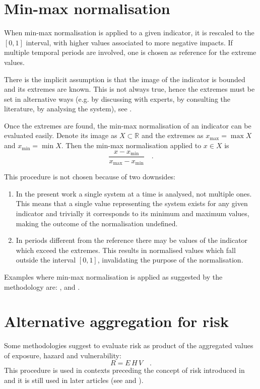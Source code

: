 \section{Min-max normalisation}
\label{sec:Min-max normalisation}
When min-max normalisation is applied to a given \gls{indicator}, it is rescaled to the $[0, 1]$ interval, with higher values associated to more negative \glspl{impact}. If multiple temporal periods are involved, one is chosen as reference for the extreme values.\cite[85]{2008OECDHandbookOn}

There is the implicit assumption is that the image of the \gls{indicator} is bounded and its extremes are known. This is not always true, hence the extremes must be set in alternative ways (e.g. by discussing with experts, by consulting the literature, by analysing the system), see \cite[113-115]{2017GIZTheVulnerability}.

Once the extremes are found, the min-max normalisation of an \gls{indicator} can be evaluated easily. Denote its image as $X \subset \mathbb{R}$ and the extremes as $x_\text{max} = \max X$ and $x_\text{min} = \min X$. Then the min-max normalisation applied to $x \in X$ is
\begin{equation}
  \label{eq:min-max}
  \frac{x - x_\text{min}}{x_\text{max} - x_\text{min}}
  \quad .
\end{equation}

This procedure is not chosen because of two downsides:
\begin{enumerate}
  \item In the present work a single system at a time is analysed, not multiple ones. This means that a single value representing the system exists for any given \gls{indicator} and trivially it corresponds to its minimum and maximum values, making the outcome of the normalisation undefined.
  \item In periods different from the reference there may be values of the \gls{indicator} which exceed the extremes. This results in normalised values which fall outside the interval $[0, 1]$, invalidating the purpose of the normalisation.
\end{enumerate}

Examples where min-max normalisation is applied as suggested by the methodology are: \cite[6]{2023DeVivoApplicationOf}, \cite[6]{2023DeVivoClimate-RiskAssessment} and \cite[74]{2017GIZVulnerabilitySourcebook}.



\section{Alternative aggregation for risk}
Some methodologies suggest to evaluate \gls{risk} as product of the aggregated values of \gls{exposure}, \gls{hazard} and \gls{vulnerability}:
\begin{equation}
  \label{eq:risk_product_aggregated}
  R = E \, H \, V
  \quad .
\end{equation}
This procedure is used in contexts preceding the concept of \gls{risk} introduced in \cite{2012FieldManagingThe} and it is still used in later articles (see \cite[7]{2023DeVivoApplicationOf} and \cite[6]{2023DeVivoClimate-RiskAssessment}).


